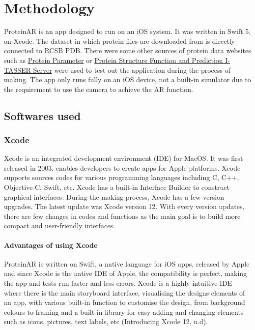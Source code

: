 \chapter{Methodology}
\label{ch:methodology}

ProteinAR is an app designed to run on an iOS system. It was written in Swift 5, on Xcode. The dataset in which protein files are downloaded from is directly connected to RCSB PDB. There were some other sources of protein data websites such as \href{https://web.expasy.org/protparam/} {Protein Parameter} or \href{https://zhanglab.ccmb.med.umich.edu/I-TASSER/}{Protein Structure Function and Prediction I-TASSER Server} were used to test out the application during the process of making.
The app only runs fully on an iOS device, not a built-in simulator due to the requirement to use the camera to achieve the AR function.

\section{Softwares used}
	\subsection{Xcode}
Xcode is an integrated development environment (IDE) for MacOS. It was first released in 2003, enables developers to create apps for Apple platforms. Xcode supports sources codes for various programming languages including C, C++, Objective-C, Swift, etc. Xcode has a built-in Interface Builder to construct graphical interfaces. 
During the making process, Xcode has a few version upgrades. The latest update was Xcode version 12. With every version updates, there are few changes in codes and functions as the main goal is to build more compact and user-friendly interfaces.
		\subsubsection{Advantages of using Xcode}
ProteinAR is written on Swift, a native language for iOS apps, released by Apple and since Xcode is the native IDE of Apple, the compatibility is perfect, making the app and tests run faster and less errors. Xcode is a highly intuitive IDE where there is the main storyboard interface, visualising the designs elements of an app, with various built-in function to customise the design, from background colours to framing and a built-in library for easy adding and changing elements such as icons, pictures, text labels, etc (Introducing Xcode 12, n.d).
